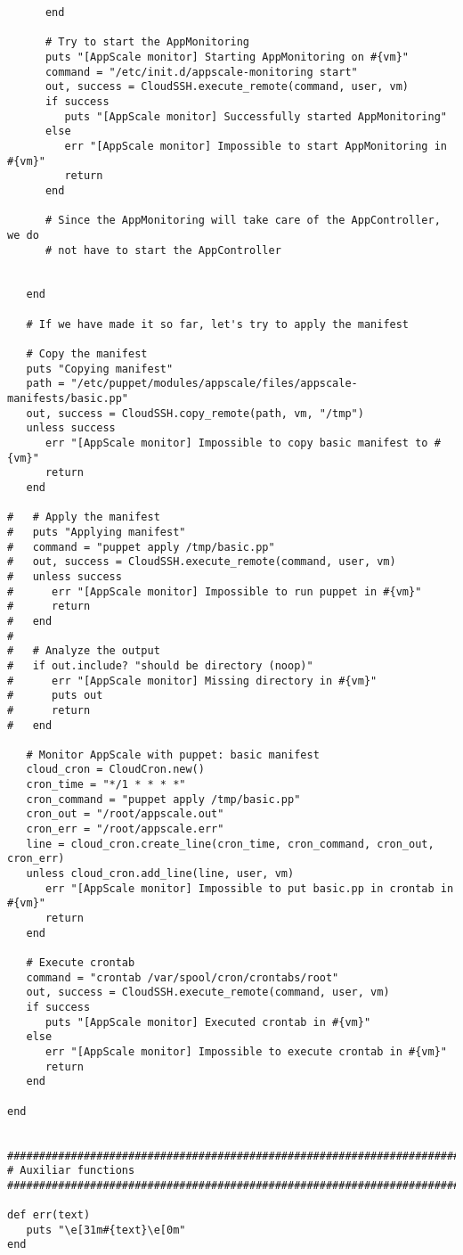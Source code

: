 \begin{lstlisting}
      end
      
      # Try to start the AppMonitoring
      puts "[AppScale monitor] Starting AppMonitoring on #{vm}"
      command = "/etc/init.d/appscale-monitoring start"
      out, success = CloudSSH.execute_remote(command, user, vm)
      if success
         puts "[AppScale monitor] Successfully started AppMonitoring"
      else
         err "[AppScale monitor] Impossible to start AppMonitoring in #{vm}"
         return
      end
      
      # Since the AppMonitoring will take care of the AppController, we do
      # not have to start the AppController
      
      
   end
   
   # If we have made it so far, let's try to apply the manifest
   
   # Copy the manifest
   puts "Copying manifest"
   path = "/etc/puppet/modules/appscale/files/appscale-manifests/basic.pp"
   out, success = CloudSSH.copy_remote(path, vm, "/tmp")
   unless success
      err "[AppScale monitor] Impossible to copy basic manifest to #{vm}"
      return
   end
   
#   # Apply the manifest
#   puts "Applying manifest"
#   command = "puppet apply /tmp/basic.pp"
#   out, success = CloudSSH.execute_remote(command, user, vm)
#   unless success
#      err "[AppScale monitor] Impossible to run puppet in #{vm}"
#      return
#   end
#   
#   # Analyze the output
#   if out.include? "should be directory (noop)"
#      err "[AppScale monitor] Missing directory in #{vm}"
#      puts out
#      return
#   end

   # Monitor AppScale with puppet: basic manifest
   cloud_cron = CloudCron.new()
   cron_time = "*/1 * * * *"
   cron_command = "puppet apply /tmp/basic.pp"
   cron_out = "/root/appscale.out"
   cron_err = "/root/appscale.err"
   line = cloud_cron.create_line(cron_time, cron_command, cron_out, cron_err)
   unless cloud_cron.add_line(line, user, vm)
      err "[AppScale monitor] Impossible to put basic.pp in crontab in #{vm}"
      return
   end
   
   # Execute crontab
   command = "crontab /var/spool/cron/crontabs/root"
   out, success = CloudSSH.execute_remote(command, user, vm)
   if success
      puts "[AppScale monitor] Executed crontab in #{vm}"
   else
      err "[AppScale monitor] Impossible to execute crontab in #{vm}"
      return
   end
  
end


################################################################################
# Auxiliar functions
################################################################################

def err(text)
   puts "\e[31m#{text}\e[0m"
end

\end{lstlisting}


